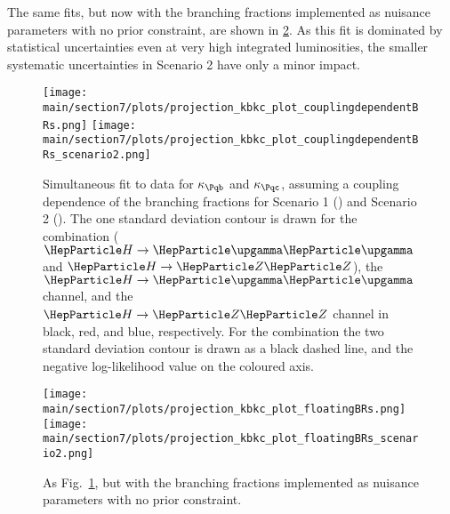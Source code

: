 \documentclass[../report.tex]{subfiles}
\providecommand{\main}{..}
\begin{document}
The same fits, but now with the branching fractions implemented as nuisance parameters with no prior constraint, are shown in \ref{fig:kbkc_floatingBRs}.
% 
As this fit is dominated by statistical uncertainties even at very high integrated luminosities, the smaller systematic uncertainties in Scenario 2 have only a minor impact.



\begin{figure}[hbtp]
  \begin{center}
    \texttt{[image: \\main/section7/plots/projection\_kbkc\_plot\_couplingdependentBRs.png]}
    \texttt{[image: \\main/section7/plots/projection\_kbkc\_plot\_couplingdependentBRs\_scenario2.png]}
    \caption{
        Simultaneous fit to data for $\kappab$ and $\kappac$, assuming a coupling dependence of the branching fractions for Scenario 1 (\UcmsLeft) and Scenario 2 (\UcmsRight).
        The one standard deviation contour is drawn for the combination ($\hgg$ and $\hzz$), the $\hgg$ channel, and the $\hzz$ channel in black, red, and blue, respectively.
        For the combination the two standard deviation contour is drawn as a black dashed line, and the negative log-likelihood value on the coloured axis.
        }
    \label{fig:kbkc_couplingdependentBRs}
  \end{center}
\end{figure}

\begin{figure}[hbtp]
  \begin{center}
    \texttt{[image: \\main/section7/plots/projection\_kbkc\_plot\_floatingBRs.png]}
    \texttt{[image: \\main/section7/plots/projection\_kbkc\_plot\_floatingBRs\_scenario2.png]}
    \caption{
        As Fig.~\ref{fig:kbkc_couplingdependentBRs}, but with the branching fractions implemented as nuisance parameters with no prior constraint.
        }
    \label{fig:kbkc_floatingBRs}
  \end{center}
\end{figure}
\end{document}
